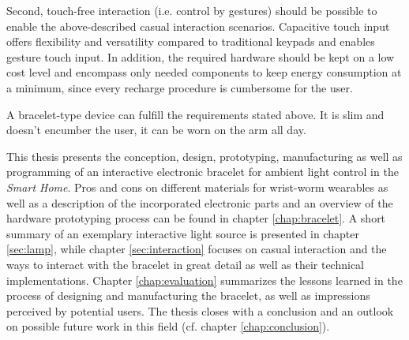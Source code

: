 Second, touch-free interaction (i.e. control by gestures) should be possible to enable the above-described casual interaction scenarios. Capacitive touch input offers flexibility and versatility compared to traditional keypads and enables gesture touch input. In addition, the required hardware should be kept on a low cost level and encompass only needed components to keep energy consumption at a minimum, since every recharge procedure is cumbersome for the user.

A bracelet-type device can fulfill the requirements stated above. It is slim and doesn't encumber the user, it can be worn on the arm all day.

This thesis presents the conception, design, prototyping, manufacturing as well as programming of an interactive electronic bracelet for ambient light control in the \textit{Smart Home}. Pros and cons on different materials for wrist-worm wearables as well as a description of the incorporated electronic parts and an overview of the hardware prototyping process can be found in chapter \ref{chap:bracelet}. A short summary of an exemplary interactive light source is presented in chapter \ref{sec:lamp}, while chapter \ref{sec:interaction} focuses on casual interaction and the ways to interact with the bracelet in great detail as well as their technical implementations. Chapter \ref{chap:evaluation} summarizes the lessons learned in the process of designing and manufacturing the bracelet, as well as impressions perceived by potential users. The thesis closes with a conclusion and an outlook on possible future work in this field (cf. chapter \ref{chap:conclusion}).